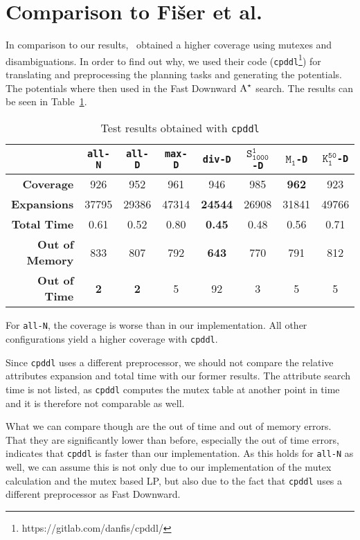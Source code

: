 \section{Comparison to Fi{\v{s}}er et al.}\label{sec:comparison-to-fiser}
In comparison to our results,~\cite{fivser2020strengthening} obtained a higher coverage using mutexes and disambiguations.
In order to find out why, we used their code (\texttt{cpddl}\footnote{https://gitlab.com/danfis/cpddl/}) for translating and preprocessing the planning tasks and generating the potentials.
The potentials where then used in the Fast Downward $\textup{A}^\star$ search.
The results can be seen in Table~\ref{table:fiser}.

\begin{table}[h!]
    \begin{center}
        \begin{tabular}{|r|c|c|c|c|c|c|c|}
            \hline
            & \textbf{\texttt{all-N}} & \textbf{\texttt{all-D}} & \textbf{\texttt{max-D}} & \textbf{\texttt{div-D}} & \textbf{$\texttt{S}_\texttt{1000}^\texttt{1}$\texttt{-D}} & \textbf{$\texttt{M}_\texttt{1}$\texttt{-D}} & \textbf{$\texttt{K}_\texttt{1}^\texttt{50}$\texttt{-D}} \\
            \hline \hline
            \textbf{Coverage}       & 926       & 952       & 961   & 946           & 985   & \textbf{962}  & 923   \\ \hline
            \textbf{Expansions}     & 37795     & 29386     & 47314 & \textbf{24544}& 26908 & 31841         & 49766 \\ \hline
            \textbf{Total Time}     & 0.61      & 0.52      & 0.80  & \textbf{0.45} & 0.48  & 0.56          & 0.71  \\ \hline
            \textbf{Out of Memory}  & 833       & 807       & 792   & \textbf{643}  & 770   & 791           & 812   \\ \hline
            \textbf{Out of Time}    & \textbf{2}& \textbf{2}& 5     & 92            & 3     & 5             & 5     \\ \hline
        \end{tabular}
        \caption{Test results obtained with \texttt{cpddl}}
        \label{table:fiser}
    \end{center}
\end{table}

For \texttt{all-N}, the coverage is worse than in our implementation.
All other configurations yield a higher coverage with \texttt{cpddl}.

Since \texttt{cpddl} uses a different preprocessor, we should not compare the relative attributes expansion and total time with our former results.
The attribute search time is not listed, as \texttt{cpddl} computes the mutex table at another point in time and it is therefore not comparable as well.

What we can compare though are the out of time and out of memory errors.
That they are significantly lower than before, especially the out of time errors, indicates that \texttt{cpddl} is faster than our implementation.
As this holds for \texttt{all-N} as well, we can assume this is not only due to our implementation of the mutex calculation and the mutex based LP, but also due to the fact that \texttt{cpddl} uses a different preprocessor as Fast Downward.
